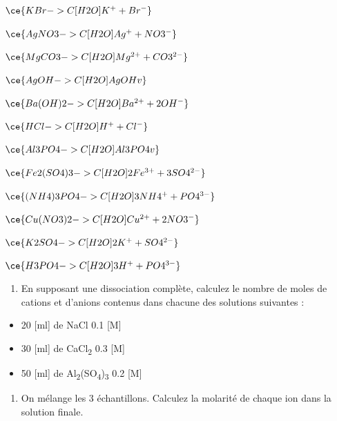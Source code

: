 \documentclass[
  11pt,
  a4paper,
  openany]{book}
\providecommand{\tightlist}{%
  \setlength{\itemsep}{0pt}\setlength{\parskip}{0pt}}
\begin{document}
\begin{Answer}

\begin{multicols}{2}
\(\ce{KBr ->C[H2O] K^{+} + Br^{-} }\)

\(\ce{AgNO3 ->C[H2O] Ag^{+} + NO3^{-} }\)

\(\ce{MgCO3 ->C[H2O] Mg^{2+} + CO3^{2-} }\)

\(\ce{AgOH ->C[H2O] AgOH v }\)

\(\ce{Ba(OH)2 ->C[H2O] Ba^{2+} + 2OH^{-} }\)

\(\ce{HCl ->C[H2O] H^{+} + Cl^{-}}\)

\(\ce{Al3PO4 ->C[H2O] Al3PO4 v }\)

\(\ce{Fe2(SO4)3 ->C[H2O] 2Fe^{3+} + 3SO4^{2-} }\)

\(\ce{(NH4)3PO4 ->C[H2O] 3NH4^{+} + PO4^{3-} }\)

\(\ce{Cu(NO3)2 ->C[H2O] Cu^{2+} + 2NO3^{-} }\)

\(\ce{K2SO4 ->C[H2O] 2K^{+} + SO4^{2-} }\)

\(\ce{H3PO4 ->C[H2O] 3H^{+} + PO4^{3-} }\)

\end{multicols}

\end{Answer}

\begin{Exercise}

\begin{enumerate}
\def\labelenumi{\arabic{enumi}.}
\tightlist
\item
  En supposant une dissociation complète, calculez le nombre de moles de cations et d'anions contenus dans chacune des solutions suivantes :
\end{enumerate}

\begin{itemize}
\tightlist
\item
  20 {[}ml{]} de NaCl 0.1 {[}M{]}\\
\item
  30 {[}ml{]} de CaCl\textsubscript{2} 0.3 {[}M{]}\\
\item
  50 {[}ml{]} de Al\textsubscript{2}(SO\textsubscript{4})\textsubscript{3} 0.2 {[}M{]}\\
\end{itemize}

\begin{enumerate}
\def\labelenumi{\arabic{enumi}.}
\setcounter{enumi}{1}
\tightlist
\item
  On mélange les 3 échantillons. Calculez la molarité de chaque ion dans la solution finale.\\
\end{enumerate}

\end{Exercise}
\end{document}
